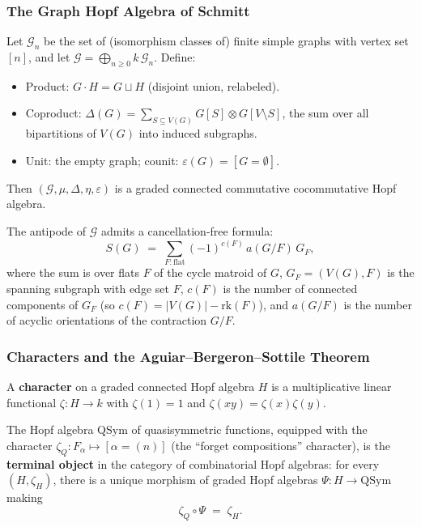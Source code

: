 \subsubsection{The Graph Hopf Algebra of Schmitt}

\begin{definition}\label{def:schmitt}
Let $\mathcal G_n$ be the set of (isomorphism classes of) finite
simple graphs with vertex set $[n]$, and let
$\mathcal G = \bigoplus_{n \ge 0} k\, \mathcal G_n$. Define:
\begin{itemize}
  \item Product: $G \cdot H = G \sqcup H$ (disjoint union, relabeled).
  \item Coproduct:
        $\Delta(G) = \sum_{S \subseteq V(G)} G[S] \otimes G[V \setminus S]$,
        the sum over all bipartitions of $V(G)$ into induced subgraphs.
  \item Unit: the empty graph; counit: $\varepsilon(G) = [G = \emptyset]$.
\end{itemize}
Then $(\mathcal G, \mu, \Delta, \eta, \varepsilon)$ is a graded
connected commutative cocommutative Hopf algebra.
\end{definition}

\begin{theorem}
The antipode of $\mathcal G$ admits a cancellation-free formula:
\[
  S(G) \;=\; \sum_{F : \mathrm{flat}} (-1)^{c(F)} \, a(G/F) \, G_F,
\]
where the sum is over flats $F$ of the cycle matroid of $G$,
$G_F = (V(G), F)$ is the spanning subgraph with edge set $F$, $c(F)$ is
the number of connected components of $G_F$ (so
$c(F) = |V(G)| - \mathrm{rk}(F)$), and $a(G/F)$ is the number of acyclic
orientations of the contraction $G/F$.
\end{theorem}

\subsubsection{Characters and the Aguiar--Bergeron--Sottile Theorem}

\begin{definition}[Character]
A \textbf{character} on a graded connected Hopf algebra $H$ is a
multiplicative linear functional $\zeta : H \to k$ with
$\zeta(1) = 1$ and $\zeta(xy) = \zeta(x) \zeta(y)$.
\end{definition}

\begin{theorem}\label{thm:abs}
The Hopf algebra $\mathrm{QSym}$ of quasisymmetric functions, equipped
with the character $\zeta_Q : F_\alpha \mapsto [\alpha = (n)]$ (the
``forget compositions'' character), is the \textbf{terminal object}
in the category of combinatorial Hopf algebras: for every
$(H, \zeta_H)$, there is a unique morphism of graded Hopf algebras $\Psi : H \to \mathrm{QSym}$
making
\[
  \zeta_Q \circ \Psi \;=\; \zeta_H.
\]
\end{theorem}

